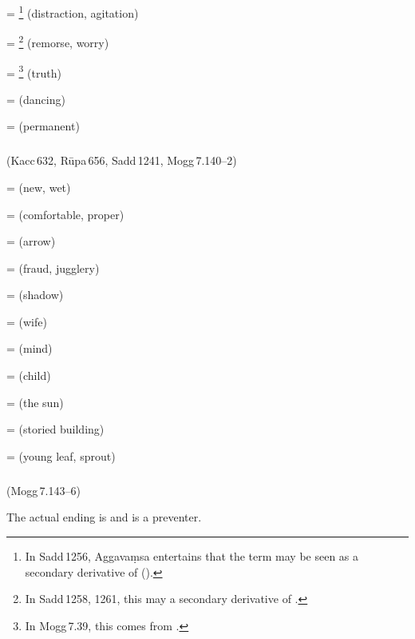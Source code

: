  = \footnote{In Sadd\,1256, Aggava\d msa entertains that the term may be seen as a secondary derivative of  ().} (distraction, agitation)\par
{} = \footnote{In Sadd\,1258, 1261, this may a secondary derivative of .} (remorse, worry)\par
{} = \footnote{In Mogg\,7.39, this comes from .} (truth)\par
{} =  (dancing)\par
{} =  (permanent)\par

\subparagraph*{} (Kacc\,632, R\=upa\,656, Sadd\,1241, Mogg\,7.140--2)\label{pacckx:ya}

 =  (new, wet)\par
{} =  (comfortable, proper)\par
{} =  (arrow)\par
{} =  (fraud, jugglery)\par
{} =  (shadow)\par
{} =  (wife)\par
{} =  (mind)\par
{} =  (child)\par
{} =  (the sun)\par
{} =  (storied building)\par
{} =  (young leaf, sprout)\par

\subparagraph*{} (Mogg\,7.143--6)\label{pacckx:raka}

The actual ending is  and  is a  preventer.


